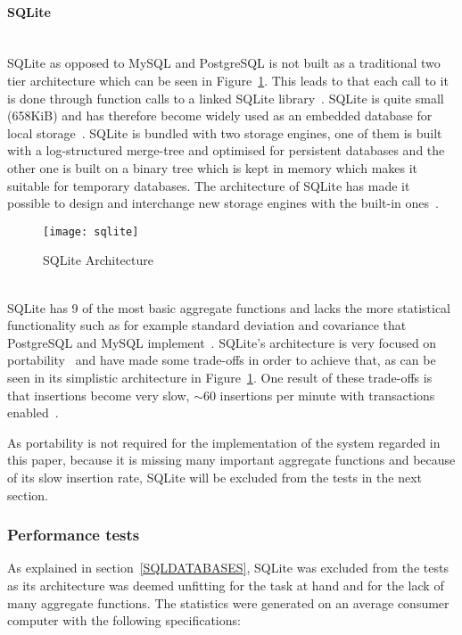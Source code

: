 \documentclass[a4paper,12pt]{article}
\begin{document}
\paragraph{SQLite}
~\\
SQLite as opposed to MySQL and PostgreSQL is not built as a traditional two tier architecture which can be seen in Figure~\ref{fig:sqlite}.
This leads to that each call to it is done through function calls to a linked SQLite library~\cite{SQLITEDEV}. SQLite is quite small (658KiB) and has therefore become widely used as an embedded database 
for local storage~\cite{SQLITE}. SQLite is bundled with two storage engines, one of them is built with a log-structured merge-tree and optimised for persistent 
databases and the other one is built on a binary tree which is kept in memory which makes it suitable for temporary databases. The architecture of SQLite has made it possible to design and interchange 
new storage engines with the built-in ones~\cite{SQLITEENGINE}.

\begin{figure}[h!]
    \vspace{0.25in}
    \centerline{\texttt{[image: sqlite]}}
    \caption{SQLite Architecture~\cite{SQLITE}}
    \label{fig:sqlite}
\end{figure}
~\\

SQLite has 9 of the most basic aggregate functions and lacks the more statistical functionality such as for example standard deviation and covariance that PostgreSQL and MySQL implement~\cite{SQLITEAGG}. 
SQLite's architecture is very focused on portability~\cite{SQLITE} and have made some trade-offs in order to achieve that, as can be seen in its simplistic architecture in Figure~\ref{fig:sqlite}. 
One result of these trade-offs is that insertions become very slow, $\sim60$ insertions per minute with transactions enabled~\cite{SQLITESLOW}.

As portability is not required for the implementation of the system regarded in this paper, because it is missing many important aggregate functions and because of its slow insertion rate, 
SQLite will be excluded from the tests in the next section. 

\newpage
\subsubsection{Performance tests}
As explained in section~\ref{SQLDATABASES}, SQLite was excluded from the tests as its architecture was deemed unfitting for the task at hand and for the lack of many aggregate functions.
The statistics were generated on an average consumer computer with the following specifications:
\end{document}
